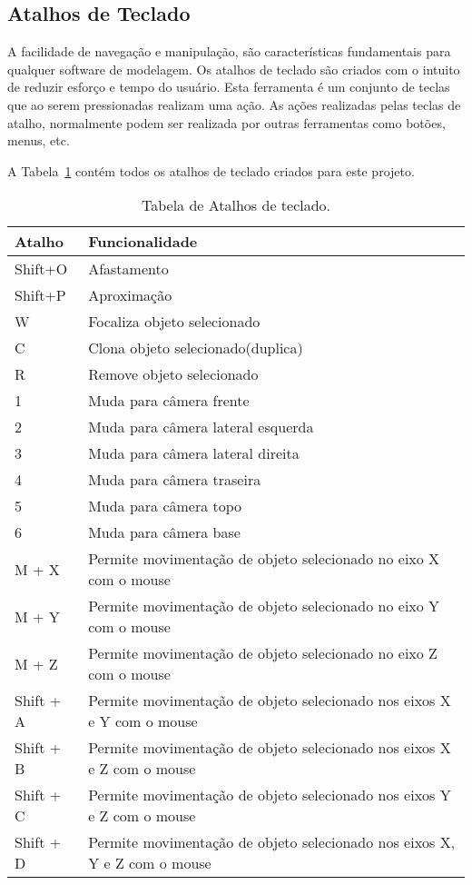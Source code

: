 	\subsection{Atalhos de Teclado}
	A facilidade de navegação e manipulação, são características fundamentais para qualquer software de modelagem. Os atalhos de teclado são criados com o intuito de reduzir esforço e tempo do usuário. Esta ferramenta é um conjunto de teclas que ao serem pressionadas realizam uma ação. As ações realizadas pelas teclas de atalho, normalmente podem ser realizada por outras ferramentas como botões, menus, etc.
	
	A Tabela~\ref{tb:shortcuts} contém todos os atalhos de teclado criados para este projeto.

\begin{table}
\centering
\begin{tabular}{|l|l|}
	\hline
		Atalho & Funcionalidade \\ \hline
		Shift+O &  Afastamento\\ \hline
		Shift+P &  Aproximação\\ \hline
		W & Focaliza objeto selecionado\\ \hline
		C & Clona objeto selecionado(duplica)\\ \hline
		R & Remove objeto selecionado \\ \hline
		1 & Muda para câmera frente \\ \hline
		2 & Muda para câmera lateral esquerda \\ \hline
		3 & Muda para câmera lateral direita \\ \hline
		4 & Muda para câmera traseira \\ \hline
		5 & Muda para câmera topo \\ \hline
		6 & Muda para câmera base \\ \hline
		M + X & Permite movimentação de objeto selecionado no eixo X com o mouse \\ \hline
		M + Y & Permite movimentação de objeto selecionado no eixo Y com o mouse \\ \hline
		M + Z & Permite movimentação de objeto selecionado no eixo Z com o mouse \\ \hline
		Shift + A & Permite movimentação de objeto selecionado nos eixos X e Y com o mouse \\ \hline
		Shift + B & Permite movimentação de objeto selecionado nos eixos X e Z com o mouse \\ \hline
		Shift + C & Permite movimentação de objeto selecionado nos eixos Y e Z com o mouse \\ \hline
		Shift + D & Permite movimentação de objeto selecionado nos eixos X, Y e Z com o mouse \\ 
	\hline
\end{tabular}
\caption{Tabela de Atalhos de teclado.}
\label{tb:shortcuts}
\end{table}
	
